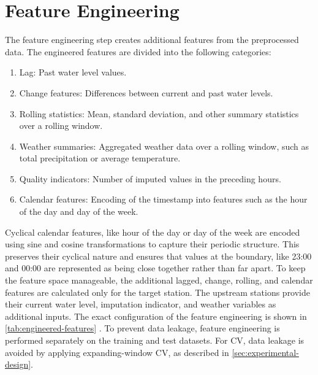 \section{Feature Engineering}
\label{sec:feature-engineering}
The feature engineering step creates additional features from the preprocessed data. The engineered features are divided into the following categories:
\begin{enumerate}
  \item Lag: Past water level values.
  \item Change features: Differences between current and past water levels.
  \item Rolling statistics: Mean, standard deviation, and other summary statistics over a rolling window.
  \item Weather summaries: Aggregated weather data over a rolling window, such as total precipitation or average temperature.
  \item Quality indicators: Number of imputed values in the preceding hours.
  \item Calendar features: Encoding of the timestamp into features such as the hour of the day and day of the week.
\end{enumerate}
Cyclical calendar features, like hour of the day or day of the week are encoded using sine and cosine transformations to capture their periodic structure. This preserves their cyclical nature and ensures that values at the boundary, like 23:00 and 00:00 are represented as being close together rather than far apart.
To keep the feature space manageable, the additional lagged, change, rolling, and calendar features are calculated only for the target station. The upstream stations provide their current water level, imputation indicator, and weather variables as additional inputs. The exact configuration of the feature engineering is shown in \autoref{tab:engineered-features} \cite{meisenbacherReviewAutomatedTime2022}. To prevent data leakage, feature engineering is performed separately on the training and test datasets. For \ac{CV}, data leakage is avoided by applying expanding-window \ac{CV}, as described in \autoref{sec:experimental-design}.
